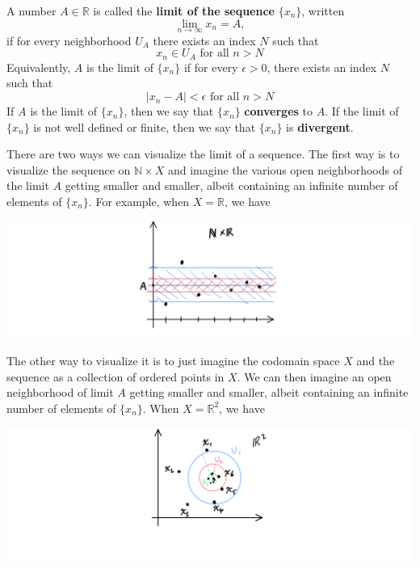 \documentclass{article}
\begin{document}
      \begin{definition}
        A number $A \in \mathbb{R}$ is called the \textbf{limit of the sequence} $\{x_n\}$, written 
        \[ \lim_{n \rightarrow \infty} x_n = A,\]
        if for every neighborhood $U_A$ there exists an index $N$ such that 
        \[x_n \in U_A \text{ for all } n > N\]
        Equivalently, $A$ is the limit of $\{x_n\}$ if for every $\epsilon>0$, there exists an index $N$ such that
        \[ |x_n - A| < \epsilon \text{ for all } n > N\]
        If $A$ is the limit of $\{x_n\}$, then we say that $\{x_n\}$ \textbf{converges} to $A$. If the limit of $\{x_n\}$ is not well defined or finite, then we say that $\{x_n\}$ is \textbf{divergent}. 

        There are two ways we can visualize the limit of a sequence. The first way is to visualize the sequence on $\mathbb{N} \times X$ and imagine the various open neighborhoods of the limit $A$ getting smaller and smaller, albeit containing an infinite number of elements of $\{x_n\}$. For example, when $X = \mathbb{R}$, we have
        \begin{center}
          \includegraphics[scale=0.25]{img/Limit_Sequence_R1.PNG}
        \end{center}
        The other way to visualize it is to just imagine the codomain space $X$ and the sequence as a collection of ordered points in $X$. We can then imagine an open neighborhood of limit $A$ getting smaller and smaller, albeit containing an infinite number of elements of $\{x_n\}$. When $X = \mathbb{R}^2$, we have
        \begin{center}
            \includegraphics[scale=0.25]{img/Limit_Sequence_R2.PNG}
        \end{center}
      \end{definition}
\end{document}
